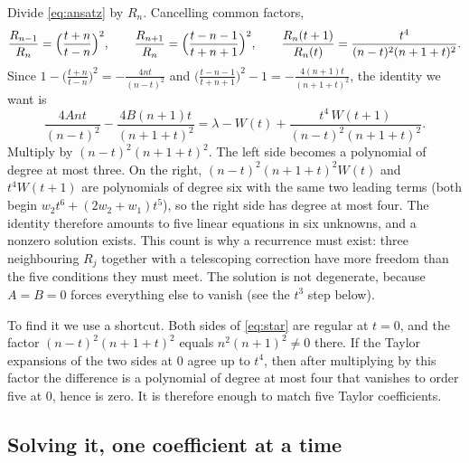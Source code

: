 \documentclass[11pt]{article}
\theoremstyle{plain}
\theoremstyle{definition}
\theoremstyle{remark}
\begin{document}
Divide \eqref{eq:ansatz} by $R_n$. Cancelling common factors,
\[
  \frac{R_{n-1}}{R_n}=\Bigl(\frac{t+n}{t-n}\Bigr)^2,\qquad
  \frac{R_{n+1}}{R_n}=\Bigl(\frac{t-n-1}{t+n+1}\Bigr)^2,\qquad
  \frac{R_n(t+1)}{R_n(t)}=\frac{t^4}{(n-t)^2(n+1+t)^2}.
\]
Since $1-\bigl(\frac{t+n}{t-n}\bigr)^2=-\frac{4nt}{(n-t)^2}$ and
$\bigl(\frac{t-n-1}{t+n+1}\bigr)^2-1=-\frac{4(n+1)t}{(n+1+t)^2}$, the identity we want is
\begin{equation}\label{eq:star}
  \frac{4Ant}{(n-t)^2}-\frac{4B(n+1)t}{(n+1+t)^2}=\lambda-W(t)+\frac{t^4\,W(t+1)}{(n-t)^2(n+1+t)^2}.
\end{equation}
Multiply by $(n-t)^2(n+1+t)^2$. The left side becomes a polynomial of degree at most three. On the
right, $(n-t)^2(n+1+t)^2W(t)$ and $t^4W(t+1)$ are polynomials of degree six with the same two
leading terms (both begin $w_2t^6+(2w_2+w_1)t^5$), so the right side has degree at most four.
The identity therefore amounts to five linear equations in six unknowns, and a nonzero solution
exists. This count is why a recurrence must exist: three neighbouring $R_j$ together with a
telescoping correction have more freedom than the five conditions they must meet. The solution is
not degenerate, because $A=B=0$ forces everything else to vanish (see the $t^3$ step below).

To find it we use a shortcut. Both sides of \eqref{eq:star} are regular at $t=0$, and the factor
$(n-t)^2(n+1+t)^2$ equals $n^2(n+1)^2\ne0$ there. If the Taylor expansions of the two sides at $0$
agree up to $t^4$, then after multiplying by this factor the difference is a polynomial of degree
at most four that vanishes to order five at $0$, hence is zero. It is therefore enough to match five
Taylor coefficients.

\subsection{Solving it, one coefficient at a time}
\end{document}
